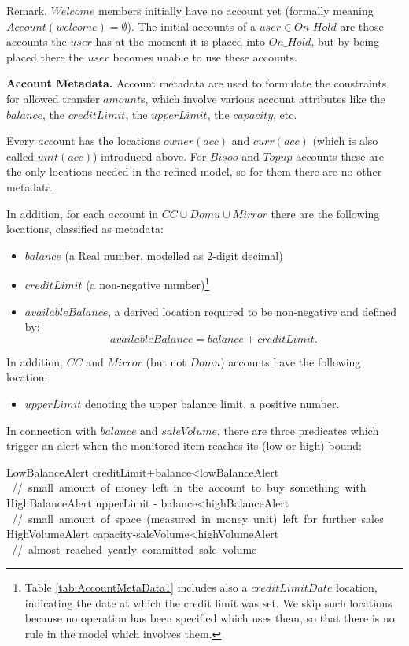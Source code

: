 Remark. $Welcome$ members initially have no account yet (formally meaning  $Account(welcome)=\emptyset$). The initial accounts of a 
$user \in On\_Hold$ are those accounts the $user$ has at the moment it is placed into $On\_Hold$, but by being placed there the $user$ becomes unable to use these accounts.

{\bf Account Metadata.} Account metadata are used to formulate the constraints for allowed transfer $amount$s, which involve various account attributes like the $balance$, the $creditLimit$, the $upperLimit$, the $capacity$, etc. 

Every $acc$ount has the locations $owner(acc)$ and $curr(acc)$ (which is also called $unit(acc)$) introduced above. For $Bisoo$ and $Topup$ accounts these are the only locations needed in the refined model, so for them there are no other metadata. 

In addition, for each $acc$ount in $CC \cup Domu \cup Mirror$ there are the following locations, classified as metadata:

\begin{itemize}
	\item $balance$ (a Real number, modelled as 2-digit decimal)
	
	\item $creditLimit$ (a non-negative number)\footnote{Table \ref{tab:AccountMetaData1} includes also a $creditLimitDate$ location, indicating the date at which the credit limit was set. We skip such locations because no operation has been specified which uses them, so that there is no rule in the model which involves them.}
	
	\item $availableBalance$, a derived location required to be non-negative and defined by:
	\[availableBalance = balance + creditLimit.\]
\end{itemize}

In addition, $CC$ and $Mirror$ (but not $Domu$) accounts have the following  location:
\begin{itemize}
\item $upperLimit$ denoting the upper balance limit, a positive number.
\end{itemize}
In connection with $balance$ and $saleVolume$, there are three predicates which trigger an alert when the monitored item reaches its (low or high) bound:
\begin{asm}
LowBalanceAlert \IFF creditLimit+balance<lowBalanceAlert \+
   \mbox{ // small amount of money left in the account to buy something with}\-
HighBalanceAlert \IFF upperLimit - balance<highBalanceAlert \+
        \mbox{ // small amount of space (measured in money unit) left for further sales}\-
HighVolumeAlert \IFF capacity-saleVolume<highVolumeAlert \+
           \mbox{ // almost reached yearly committed sale volume}
\end{asm}

